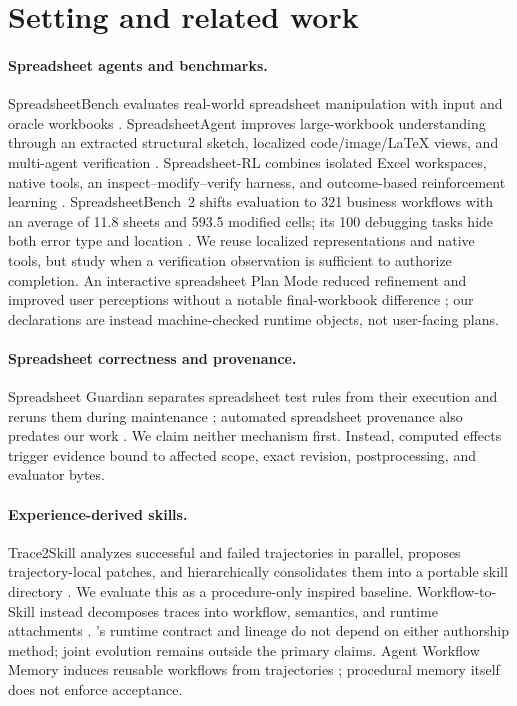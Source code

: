 \section{Setting and related work}

\paragraph{Spreadsheet agents and benchmarks.}
SpreadsheetBench evaluates real-world spreadsheet manipulation with input and
oracle workbooks \citep{ma2024spreadsheetbench}. SpreadsheetAgent improves
large-workbook understanding through an extracted structural sketch, localized
code/image/\LaTeX{} views, and multi-agent verification
\citep{ren2026spreadsheetagent}. Spreadsheet-RL combines isolated Excel
workspaces, native tools, an inspect--modify--verify harness, and outcome-based
reinforcement learning \citep{chi2026spreadsheetrl}. SpreadsheetBench~2 shifts
evaluation to 321 business workflows with an average of 11.8 sheets and 593.5
modified cells; its 100 debugging tasks hide both error type and location
\citep{zhu2026spreadsheetbench2}. We reuse localized representations and native
tools, but study when a verification observation is sufficient to authorize
completion. An interactive spreadsheet Plan Mode reduced refinement and
improved user perceptions without a notable final-workbook difference
\citep{kumar2026plans}; our declarations are instead machine-checked runtime
objects, not user-facing plans.

\paragraph{Spreadsheet correctness and provenance.}
Spreadsheet Guardian separates spreadsheet test rules from their execution and
reruns them during maintenance \citep{kulesz2018spreadsheetguardian}; automated
spreadsheet provenance also predates our work
\citep{asuncion2013spreadsheetprovenance}. We claim neither mechanism first.
Instead, computed effects trigger evidence bound to affected scope, exact
revision, postprocessing, and evaluator bytes.

\paragraph{Experience-derived skills.}
Trace2Skill analyzes successful and failed trajectories in parallel, proposes
trajectory-local patches, and hierarchically consolidates them into a portable
skill directory \citep{ni2026trace2skill}. We evaluate this as a
procedure-only inspired baseline. Workflow-to-Skill instead decomposes traces
into workflow, semantics, and runtime attachments \citep{zhang2026workflowtoskill}.
\method's runtime contract and lineage do not depend on either authorship
method; joint evolution remains outside the primary claims. Agent Workflow
Memory induces reusable workflows from trajectories
\citep{wang2025agentworkflowmemory}; procedural memory itself does not enforce
acceptance.


